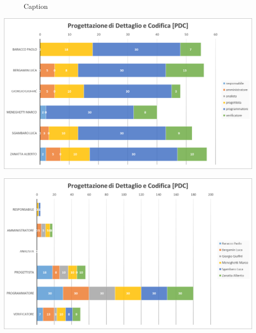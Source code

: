 \begin{figure}
  \caption{Caption}
  \label{fig:key}
\end{figure}

	{\includegraphics[width=15cm]{img/orepdc1.png}\par}

	{\includegraphics[width=15cm]{img/orepdc2.png}\par}

